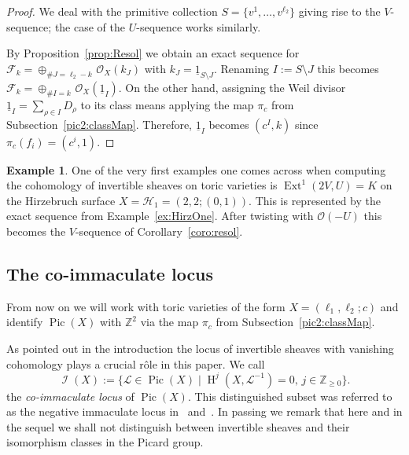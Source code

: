 \documentclass[11pt]{article}
\theoremstyle{definition}
\newtheorem{exam}[theo]{Example}
\numberwithin{equation}{section}
\newcommand{\Z}{\mathbb Z}
\newcommand{\CF}{{\mathcal F}}
\newcommand{\CH}{{\mathcal H}}
\newcommand{\CI}{{\mathcal I}}
\newcommand{\CL}{{\mathcal L}}
\newcommand{\CO}{{\mathcal O}}
\newcommand{\gH}{\operatorname{H}}
\newcommand{\Pic}{\operatorname{Pic}}
\newcommand{\gExt}{\operatorname{Ext}}
\newcommand{\ku}{\underline}
\newcommand{\kk}{K}
\newcommand{\vN}[1]{v^{#1}}
\newcommand{\fM}[1]{f_{#1}}
\newcommand{\nImm}{\operatorname{\CI}}
\newcommand{\kU}{U}
\newcommand{\kV}{V}
\renewcommand{\sharp}{\#}
\newcommand{\ssect}[1]{Subsection~\ref{#1}}
\begin{document}
\begin{proof}
We deal with the primitive collection 
$S=\{\vN{1}, \ldots,\vN{\ell_2}\}$
giving rise to the $\kV$-sequence; the
case of the $\kU$-sequence works similarly.

By Proposition~\ref{prop:Resol}
we obtain an exact sequence for 
$\CF_k=\oplus_{\sharp J=\ell_2-k\,}\CO_X(k_J)$ 
with $k_J=\ku{1}_{S\setminus J}$.
Renaming $I:=S\setminus J$ this becomes
$\CF_k=\oplus_{\sharp I=k\,}\CO_X(\ku{1}_I)$. 
On the other hand, assigning the Weil 
divisor $\ku{1}_I=\sum_{\rho\in I} D_\rho$ 
to its class means applying the map $\pi_c$ 
from \ssect{pic2:classMap}. Therefore, 
$\ku{1}_I$ becomes $(c^I,k)$ since 
$\pi_c(\fM{i})=(c^i,1)$.
\end{proof}

\begin{exam}
\label{ex:resol}
One of the very first examples one comes
across when computing the cohomology of 
invertible sheaves on toric varieties is
$\gExt^1(2\kV,\kU)=\kk$ on the Hirzebruch
surface $X=\CH_1=(2,2;(0,1))$. This is 
represented by the exact sequence from 
Example~\ref{ex:HirzOne}. After twisting 
with $\CO(-\kU)$ this becomes the 
$\kV$-sequence of Corollary~\ref{coro:resol}.
\end{exam}

\subsection{{The co-immaculate locus}}
\label{subsec:ImmLoc}
From now on we will work with toric 
varieties of the form $X=(\ell_1,\ell_2;c)$ 
and identify $\Pic(X)$ with $\Z^2$ via 
the map $\pi_c$ from 
Subsection~\ref{pic2:classMap}. 

As pointed out in the introduction the 
locus of invertible sheaves with vanishing 
cohomology plays a crucial r\^ole in this 
paper. We call
$$
\nImm(X):=\{\CL\in\Pic(X)\mid
\gH^j(X,\CL^{-1})=0,\,j\in\Z_{\geq0}\}.
$$
the {{\em co-immaculate locus}} of $\Pic(X)$. 
This distinguished subset was referred to 
as the {negative} immaculate locus 
in~\cite{immaculate} and~\cite{p1p1p1}. 
In passing we remark that here and in the sequel we 
shall not distinguish between invertible 
sheaves and their isomorphism classes in 
the Picard group.
\end{document}
